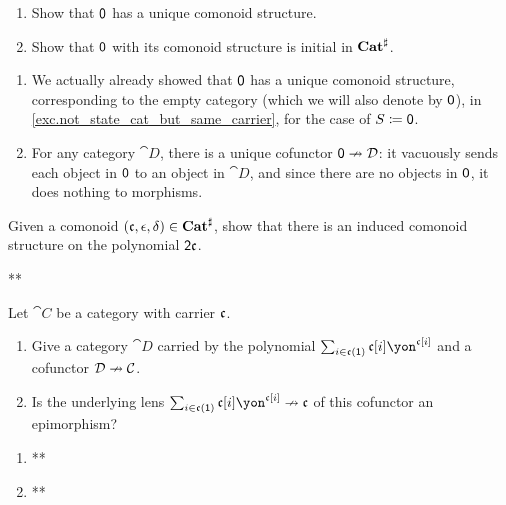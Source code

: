 \documentclass[Book-Poly]{subfiles}
\begin{document}
\begin{exercise}\label{exc.0_initial_com}
\begin{enumerate}
	\item Show that $\textsf{0}$ has a unique comonoid structure.
	\item Show that $\textsf{0}$ with its comonoid structure is initial in $\mathbf{Cat}^\sharp$.
\qedhere
\end{enumerate}
\begin{solution}
\begin{enumerate}
    \item We actually already showed that $\textsf{0}$ has a unique comonoid structure, corresponding to the empty category (which we will also denote by $\textsf{0}$), in \cref{exc.not_state_cat_but_same_carrier}, for the case of $S\coloneqq\textsf{0}$.
    \item For any category $\cat{D}$, there is a unique cofunctor $\textsf{0}\nrightarrow\mathcal{D}$: it vacuously sends each object in $\textsf{0}$ to an object in $\cat{D}$, and since there are no objects in $\textsf{0}$, it does nothing to morphisms.
\end{enumerate}
\end{solution}
\end{exercise}

\begin{exercise}
Given a comonoid $(\mathfrak{c},\epsilon,\delta)\in\mathbf{Cat}^\sharp$, show that there is an induced comonoid structure on the polynomial $\textsf{2}\mathfrak{c}$.
\begin{solution}
** %
\end{solution}
\end{exercise}

\begin{exercise}
Let $\cat{C}$ be a category with carrier $\mathfrak{c}$.
\begin{enumerate}
	\item Give a category $\cat{D}$ carried by the polynomial $\sum_{i\in\ema{c}(\1)}\ema{c}[i]\yon^{\ema{c}[i]}$ and a cofunctor $\mathcal{D}\nrightarrow\mathcal{C}$.
	\item Is the underlying lens $\sum_{i\in\ema{c}(\1)}\ema{c}[i]\yon^{\ema{c}[i]}\cof\ema{c}$ of this cofunctor an epimorphism?
\qedhere
\end{enumerate}
\begin{solution}
\begin{enumerate}
    \item **
    \item **
\end{enumerate}
\end{solution}
\end{exercise}
\end{document}
